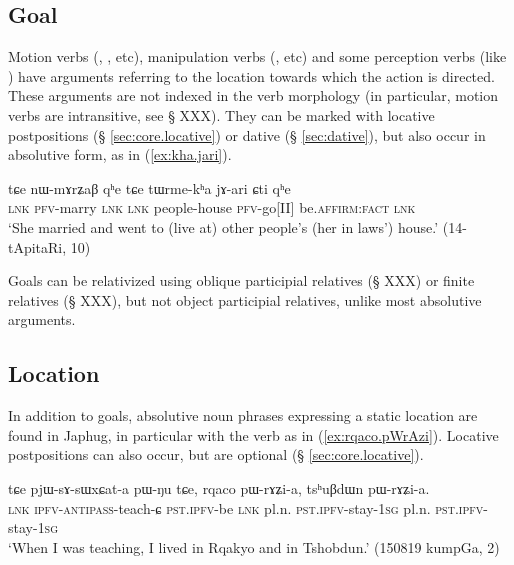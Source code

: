 \subsection{Goal} \label{absolutive.goal}  
Motion verbs (, ,  etc), manipulation verbs (,  etc) and some perception verbs (like ) have arguments referring to the location towards which the action is directed. These arguments are not indexed in the verb morphology (in particular, motion verbs are intransitive, see § XXX). They can be marked with locative postpositions (§ \ref{sec:core.locative}) or dative (§ \ref{sec:dative}), but also occur in absolutive form, as  in (\ref{ex:kha.jari}).

\begin{exe}
\ex \label{ex:kha.jari}
 \gll tɕe nɯ-mɤrʑaβ qʰe tɕe tɯrme-kʰa jɤ-ari ɕti qʰe  \\
 \textsc{lnk} \textsc{pfv}-marry \textsc{lnk}  \textsc{lnk} people-house \textsc{pfv}-go[II] be.\textsc{affirm}:\textsc{fact} \textsc{lnk} \\
\glt `She married and went to (live at) other people's (her in laws') house.' (14-tApitaRi, 10)
\end{exe}

Goals can be relativized using oblique participial relatives (§ XXX) or finite relatives (§ XXX), but not object participial relatives, unlike most absolutive arguments.

\subsection{Location} \label{absolutive.locative}
In addition to goals, absolutive noun phrases expressing a static location are found in Japhug, in particular with the verb  as in (\ref{ex:rqaco.pWrAzi}).  Locative postpositions can also occur, but are optional (§ \ref{sec:core.locative}).

\begin{exe}
\ex \label{ex:rqaco.pWrAzi}
 \gll  tɕe pjɯ-sɤ-sɯxɕat-a pɯ-ŋu tɕe, rqaco pɯ-rɤʑi-a, tsʰuβdɯn pɯ-rɤʑi-a. \\
 \textsc{lnk} \textsc{ipfv}-\textsc{antipass}-teach-ɕ \textsc{pst}.\textsc{ipfv}-be \textsc{lnk} pl.n. \textsc{pst}.\textsc{ipfv}-stay-\textsc{1sg} pl.n. \textsc{pst}.\textsc{ipfv}-stay-\textsc{1sg}  \\
 \glt `When I was teaching, I lived in Rqakyo and in Tshobdun.' (150819 kumpGa, 2)
\end{exe}

